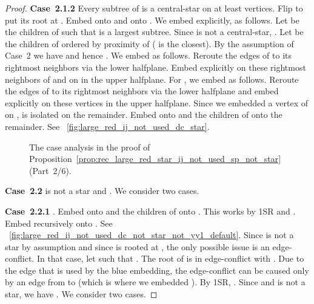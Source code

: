 \documentclass[11pt,a4paper,colorlinks=true,urlcolor=blue,citecolor=red]{article}
\theoremstyle{plain}
\newcommand{\case}[1]{\par\vspace{.5\baselineskip}\noindent\textbf{\sffamily Case~#1}}
\begin{document}
\begin{proof}
  \case{2.1.2} Every subtree of  is a central-star on at least
   vertices. Flip  to put its root at . Embed 
  onto  and  onto . We embed  explicitly, as follows. Let
   be the children of  such that  is a
  largest subtree. Since  is not a central-star,
  . Let  be the children of  ordered
  by proximity of  ( is the closest). By the assumption of
  Case~2 we have  and hence . We embed
   as follows. Reroute the edges of  to its
   rightmost neighbors via the lower halfplane. Embed
   explicitly on these  rightmost neighbors of 
  and on  in the upper halfplane. For , we embed 
  as follows. Reroute the edges of  to its  rightmost
  neighbors via the lower halfplane and embed  explicitly on
  these vertices in the upper halfplane. Since we embedded a vertex of
   on ,  is isolated on the remainder. Embed  onto
   and the children of  onto the remainder. See
  \figurename~\ref{fig:large_red_ij_not_used_dc_star}.

  \begin{figure}[t]
    \centering\hfil {}\hfil {}\hfil {}\hfil \caption{The case analysis in the proof of
      Proposition~\ref{prop:rec_large_red_star_ij_not_used_sp_not_star}~(Part~2/6).}
  \end{figure}

  \case{2.2}  is not a star and . We
  consider two cases.

  \case{2.2.1} . Embed  onto  and
  the children of  onto . This works by 1SR and
  . Embed  recursively onto . See
  \figurename~\ref{fig:large_red_ij_not_used_dc_not_star_not_yy1_default}.
  Since  is not a star by assumption and since  is
  rooted at , the only possible issue is an edge-conflict. In
  that case, let  such that . The root
   of  is in edge-conflict with . Due to the edge
   that is used by the blue embedding, the edge-conflict can be
  caused only by an edge from  to  (which is where we embedded
  ). By 1SR, . Since  and  is not
  a star, we have . We consider two cases.


\end{proof}
\end{document}
